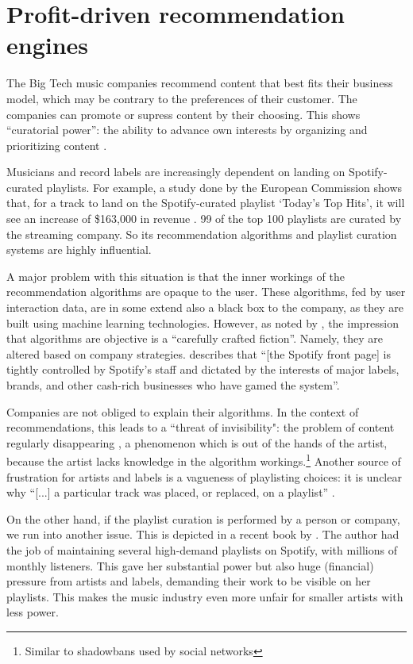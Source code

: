 \section{Profit-driven recommendation engines}
\label{sec:problem-description-recommendations}
The Big Tech music companies recommend content that best fits their business model, which may be contrary to the preferences of their customer. The companies can promote or supress %
content by their choosing. This shows ``curatorial power'': the ability to advance own interests by organizing and prioritizing content \citep{prey2020locating}.

Musicians and record labels are increasingly dependent on landing on Spotify-curated playlists. For example, a study done by the European Commission shows that, for a track to land on the Spotify-curated playlist `Today's Top Hits', it will see an increase of \$163,000 in revenue \citep{aguiar2018platforms}. 99 of the top 100 playlists are curated by the streaming company. So its recommendation algorithms and playlist curation systems are highly influential. 

A major problem with this situation is that the inner workings of the recommendation algorithms are opaque to the user. These algorithms, fed by user interaction data, are in some extend also a black box to the company, as they are built using machine learning technologies. However, as noted by \cite{gillespie2014relevance}, the impression that algorithms are objective is a ``carefully crafted fiction''. Namely, they are altered based on company strategies. \cite{thebaffler2017} describes that ``[the Spotify front page] is tightly controlled by Spotify’s staff and dictated by the interests of major labels, brands, and other cash-rich businesses who have gamed the system''.

Companies are not obliged to explain their algorithms. In the context of recommendations, this leads to a ``threat of invisibility": the problem of content regularly disappearing \citep{bucher2018if}, a phenomenon which is out of the hands of the artist, because the artist lacks knowledge in the algorithm workings.\footnote{Similar to shadowbans used by social networks} Another source of frustration for artists and labels is a vagueness of playlisting choices: it is unclear why ``[...] a particular track was placed, or replaced, on a playlist'' \citep{prey2020locating}. 

On the other hand, if the playlist curation is performed by a person or company, we run into another issue. This is depicted in a recent book by \cite{heuvelings2020}. The author had the job of maintaining several high-demand playlists on Spotify, with millions of monthly listeners. This gave her substantial power but also huge (financial) pressure from artists and labels, demanding their work to be visible on her playlists. This makes the music industry even more unfair for smaller artists with less power.

